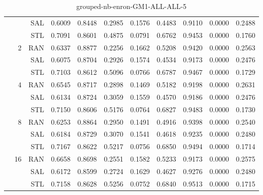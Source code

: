 \begin{center}
\begin{table}[htbp]
\begin{tabular}{ | r | r | r | r | r | r | r | r | r | r | r |}
 &   & SAL & 0.6009 & 0.8448 & 0.2985 & 0.1576 & 0.4483 & 0.9110 & 0.0000 & 0.2488\\ \cline{3-11}
 &   & STL & 0.7091 & 0.8601 & 0.4875 & 0.0791 & 0.6762 & 0.9453 & 0.0000 & 0.1760\\ \cline{2-11}
 & \multirow{3}{*}{2} & RAN & 0.6337 & 0.8877 & 0.2256 & 0.1662 & 0.5208 & 0.9420 & 0.0000 & 0.2563\\ \cline{3-11}
 &   & SAL & 0.6075 & 0.8704 & 0.2926 & 0.1574 & 0.4534 & 0.9173 & 0.0000 & 0.2476\\ \cline{3-11}
 &   & STL & 0.7103 & 0.8612 & 0.5096 & 0.0766 & 0.6787 & 0.9467 & 0.0000 & 0.1729\\ \cline{2-11}
 & \multirow{3}{*}{4} & RAN & 0.6545 & 0.8717 & 0.2898 & 0.1469 & 0.5182 & 0.9198 & 0.0000 & 0.2631\\ \cline{3-11}
 &   & SAL & 0.6134 & 0.8724 & 0.3059 & 0.1559 & 0.4570 & 0.9186 & 0.0000 & 0.2476\\ \cline{3-11}
 &   & STL & 0.7150 & 0.8606 & 0.5176 & 0.0764 & 0.6827 & 0.9483 & 0.0000 & 0.1730\\ \cline{2-11}
 & \multirow{3}{*}{8} & RAN & 0.6253 & 0.8864 & 0.2950 & 0.1491 & 0.4916 & 0.9398 & 0.0000 & 0.2540\\ \cline{3-11}
 &   & SAL & 0.6184 & 0.8729 & 0.3070 & 0.1541 & 0.4618 & 0.9235 & 0.0000 & 0.2480\\ \cline{3-11}
 &   & STL & 0.7167 & 0.8622 & 0.5217 & 0.0756 & 0.6850 & 0.9494 & 0.0000 & 0.1714\\ \cline{2-11}
 & \multirow{3}{*}{16} & RAN & 0.6658 & 0.8698 & 0.2551 & 0.1582 & 0.5233 & 0.9173 & 0.0000 & 0.2575\\ \cline{3-11}
 &   & SAL & 0.6172 & 0.8599 & 0.2724 & 0.1629 & 0.4627 & 0.9276 & 0.0000 & 0.2480\\ \cline{3-11}
 &   & STL & 0.7158 & 0.8628 & 0.5256 & 0.0752 & 0.6840 & 0.9513 & 0.0000 & 0.1715\\ \cline{2-11}
\hline
\end{tabular}
\caption{grouped-nb-enron-GM1-ALL-ALL-5}
\end{table}
\end{center}

